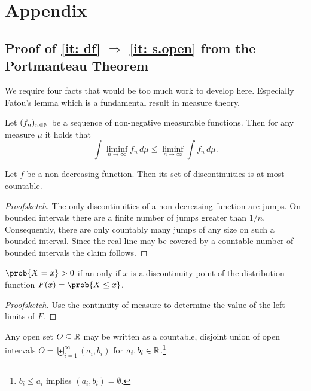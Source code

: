 \chapter{Appendix}


\section{Proof of \ref{it: df} \texorpdfstring{\(\Rightarrow\)}{⇒} \ref{it: s.open} from the Portmanteau Theorem}
\label{sec: appendix portmanteau}

We require four facts that would be too much work to develop here. Especially Fatou's lemma
which is a fundamental result in measure theory.

\begin{fact}
    \label{fact: fatou}
    Let \((f_n)_{n\in \mathbb{N}}\) be a sequence of non-negative measurable functions.
    Then for any measure \(\mu\) it holds that
    \[
        \int \liminf_{n\to\infty} f_n \, d\mu
        \le \liminf_{n\to\infty} \int f_n \, d\mu.
    \]
\end{fact}
\begin{fact}
    \label{fact: non-decreasing -> discontinuities countable}
    Let \(f\) be a non-decreasing function. Then its set of discontinuities 
    is at most countable.
\end{fact}
\begin{proof}[Proofsketch]
    The only discontinuities of a non-decreasing function are jumps.
    On bounded intervals there are a finite number of jumps greater than
    \(1/n\). Consequently, there are only countably many jumps of any size
    on such a bounded interval. Since the real line may be covered by a
    countable number of bounded intervals the claim follows.
\end{proof}
\begin{fact}
    \label{fact: discontinuity are atoms}
    \(\prob{X =x} > 0\) if an only if \(x\) is a discontinuity point of the
    distribution function \(F(x) = \prob{X \le x}\).
\end{fact}
\begin{proof}[Proofsketch]
    Use the continuity of measure to determine the value of the left-limits 
    of \(F\).
\end{proof}
\begin{fact}
    \label{fact: open set as union of intervals}
    Any open set \(O\subseteq \mathbb{R}\) may be written as a countable,
    disjoint union of open intervals \(O = \biguplus_{i=1}^\infty (a_i,
    b_i)\) for \(a_i, b_i \in \mathbb{R}\).\footnote{
        \(b_i \le a_i\) implies \((a_i, b_i) = \emptyset\).
    }
\end{fact}

